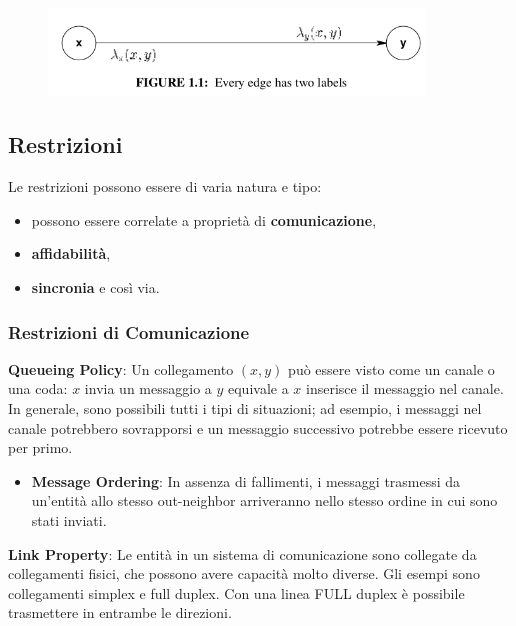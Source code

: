 \begin{figure}[H]
    \centering
    \hspace*{-0.75in}
    \includegraphics[width=10cm, keepaspectratio]{capitoli/introduzione_ambiente-distribuito/imgs/img1.png}
\end{figure}

\subsection{Restrizioni}
Le restrizioni possono essere di varia natura e tipo:

\begin{itemize}
    \item possono essere correlate a proprietà di \textbf{comunicazione},
    \item \textbf{affidabilità},
    \item \textbf{sincronia} e così via.
\end{itemize}

\subsubsection{Restrizioni di Comunicazione}
\textbf{Queueing Policy}: Un collegamento $(x, y)$ può essere visto come un
canale o una coda: $x$ invia un messaggio a $y$ equivale a $x$ inserisce il
messaggio nel canale. In generale, sono possibili tutti i tipi di situazioni; ad
esempio, i messaggi nel canale potrebbero sovrapporsi e un messaggio successivo
potrebbe essere ricevuto per primo.

\begin{itemize}
    \item \textbf{Message Ordering}: In assenza di fallimenti, i messaggi
          trasmessi da un’entità allo stesso out-neighbor arriveranno nello stesso
          ordine in cui sono stati inviati.
\end{itemize}

\textbf{Link Property}: Le entità in un sistema di comunicazione sono collegate
da collegamenti fisici, che possono avere capacità molto diverse. Gli esempi
sono collegamenti simplex e full duplex. Con una linea FULL duplex è possibile
trasmettere in entrambe le direzioni.

